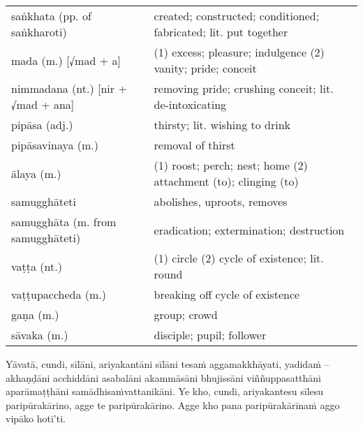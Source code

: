 \documentclass[11pt,oneside]{memoir}
\begin{document}
\begin{longtable}{L{\colOne} L{\colTwo}}
saṅkhata (pp. of saṅkharoti) & created; constructed; conditioned; fabricated; lit. put together\\[0pt]
mada (m.) [√mad + a] & (1) excess; pleasure; indulgence (2) vanity; pride; conceit\\[0pt]
nimmadana (nt.) [nir + √mad + ana] & removing pride; crushing conceit; lit. de-intoxicating\\[0pt]
pipāsa (adj.) & thirsty; lit. wishing to drink\\[0pt]
pipāsavinaya (m.) & removal of thirst\\[0pt]
ālaya (m.) & (1) roost; perch; nest; home (2) attachment (to); clinging (to)\\[0pt]
samugghāteti & abolishes, uproots, removes\\[0pt]
samugghāta (m. from samugghāteti) & eradication; extermination; destruction\\[0pt]
vaṭṭa (nt.) & (1) circle (2) cycle of existence; lit. round\\[0pt]
vaṭṭupaccheda (m.) & breaking off cycle of existence\\[0pt]
gaṇa (m.) & group; crowd\\[0pt]
sāvaka (m.) & disciple; pupil; follower\\[0pt]
\end{longtable}

\clearpage

\begin{spacedquote}
Yāvatā, cundi, sīlāni, ariyakantāni sīlāni tesaṁ aggamakkhāyati, yadidaṁ --
akhaṇḍāni acchiddāni asabalāni akammāsāni bhujissāni viññuppasatthāni
aparāmaṭṭhāni samādhisaṁvattanikāni.
Ye kho, cundi, ariyakantesu sīlesu paripūrakārino, agge te paripūrakārino.
Agge kho pana paripūrakārīnaṁ aggo vipāko hotī'ti.
\end{spacedquote}
\end{document}

